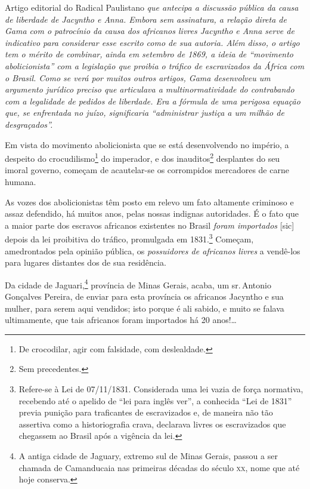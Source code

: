 \begin{didascalia}
Artigo editorial do Radical Paulistano \emph{que antecipa a discussão
pública da causa de liberdade de Jacyntho e Anna. Embora sem assinatura,
a relação direta de Gama com o patrocínio da causa dos africanos livres
Jacyntho e Anna serve de indicativo para considerar esse escrito como de
sua autoria. Além disso, o artigo tem o mérito de combinar, ainda em
setembro de 1869, a ideia de ``movimento abolicionista'' com a legislação
que proibia o tráfico de escravizados da África com o Brasil. Como se
verá por muitos outros artigos, Gama desenvolveu um argumento jurídico
preciso que articulava a multinormatividade do contrabando com a
legalidade de pedidos de liberdade. Era a fórmula de uma perigosa
equação que, se enfrentada no juízo, significaria ``administrar justiça a
um milhão de desgraçados''.}
\end{didascalia}



Em vista do movimento abolicionista que se está desenvolvendo no
império, a despeito do crocudilismo\footnote{De crocodilar, agir com
  falsidade, com deslealdade.} do imperador, e dos inauditos\footnote{
  Sem precedentes.} desplantes do seu imoral governo, começam de
acautelar-se os corrompidos mercadores de carne humana.

As vozes dos abolicionistas têm posto em relevo um fato altamente
criminoso e assaz defendido, há muitos anos, pelas nossas indignas
autoridades. É o fato que a maior parte dos escravos africanos
existentes no Brasil \emph{foram importados} {[}sic{]} depois da lei
proibitiva do tráfico, promulgada em 1831.\footnote{Refere-se à Lei de
  07/11/1831. Considerada uma lei vazia de força normativa, recebendo
  até o apelido de ``lei para inglês ver'', a conhecida ``Lei de 1831''
  previa punição para traficantes de escravizados e, de maneira não tão
  assertiva como a historiografia crava, declarava livres os
  escravizados que chegassem ao Brasil após a vigência da lei.} Começam,
amedrontados pela opinião pública, os \emph{possuidores de africanos
livres} a vendê-los para lugares distantes dos de sua residência.

Da cidade de Jaguari,\footnote{A antiga cidade de Jaguary, extremo sul
  de Minas Gerais, passou a ser chamada de Camanducaia nas primeiras
  décadas do século \textsc{xx}, nome que até hoje conserva.} província de Minas
Gerais, acaba, um sr.\,Antonio Gonçalves Pereira, de enviar para esta
província os africanos Jacyntho e sua mulher, para serem aqui vendidos;
isto porque é ali sabido, e muito se falava ultimamente, que tais
africanos foram importados há 20 anos!\ldots{}

